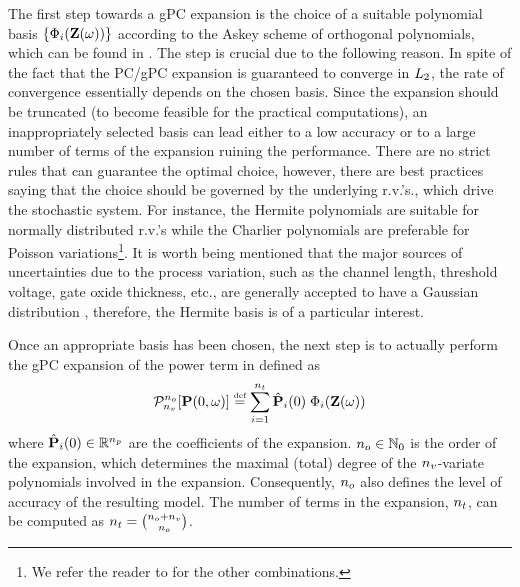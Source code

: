The first step towards a gPC expansion is the choice of a suitable polynomial basis $\{ \Phi_i(\mathbf{Z}(\omega)) \}$ according to the Askey scheme of orthogonal polynomials, which can be found in \cite{xiu2002}. The step is crucial due to the following reason. In spite of the fact that the PC/gPC expansion is guaranteed to converge in $L_{2}$, the rate of convergence essentially depends on the chosen basis. Since the expansion should be truncated (to become feasible for the practical computations), an inappropriately selected basis can lead either to a low accuracy or to a large number of terms of the expansion ruining the performance. There are no strict rules that can guarantee the optimal choice, however, there are best practices saying that the choice should be governed by the underlying r.v.'s., which drive the stochastic system. For instance, the Hermite polynomials are suitable for normally distributed r.v.'s while the Charlier polynomials are preferable for Poisson variations\footnote{We refer the reader to \cite{xiu2002} for the other combinations.}. It is worth being mentioned that the major sources of uncertainties due to the process variation, such as the channel length, threshold voltage, gate oxide thickness, etc., are generally accepted to have a Gaussian distribution \cite{srivastava2010, liu2007, juan2012}, therefore, the Hermite basis is of a particular interest.

Once an appropriate basis has been chosen, the next step is to actually perform the gPC expansion of the power term in  defined as
\begin{equation} \elabel{pc-expansion}
  \oPC{\vars}{\pcorder}{\vP(0, \o)} \eqdef \sum_{i = 1}^{\pcterms} \pcc{\vP}_i(0) \; \pcb_i(\vIRV(\o))
\end{equation}
where $\hat{\mathbf{P}}_i(0) \in \mathbb{R}^{n_p}$ are the coefficients of the expansion. ${n_o} \in \mathbb{N}_{0}$ is the order of the expansion, which determines the maximal (total) degree of the ${n_v}$-variate polynomials involved in the expansion. Consequently, ${n_o}$ also defines the level of accuracy of the resulting model. The number of terms in the expansion, ${n_t}$, can be computed as ${n_t} = {{n_o} + {n_v} \choose {n_o}}$.

